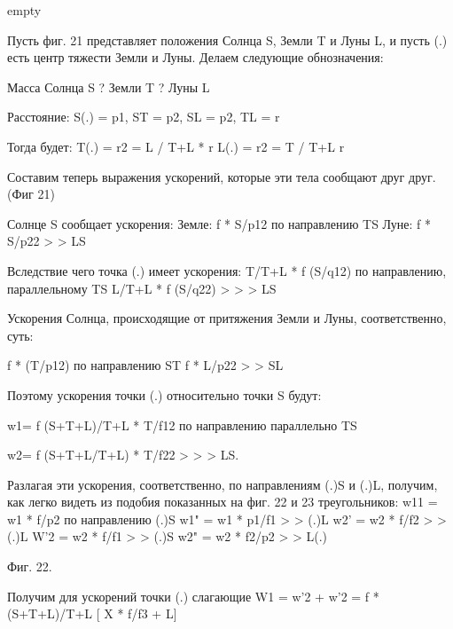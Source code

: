 \documentclass[a4paper,12pt]{article}
\begin{document}
\noindent 
empty 

Пусть фиг. 21 представляет положения Солнца S, Земли T и Луны L, и пусть (.) есть центр тяжести Земли и Луны. Делаем следующие обнозначения:

Масса Солнца S
? Земли T
? Луны L

Расстояние:
S(.) = p1, ST = p2, SL = p2, TL = r

Тогда будет:
T(.) = r2 = L / T+L * r
L(.) = r2 = T / T+L r

Составим теперь выражения ускорений, которые эти тела сообщают друг друг.
(Фиг 21)

Солнце S сообщает ускорения:
Земле: f * S/p12 по направлению TS
Луне: f * S/p22 > > LS

Вследствие чего точка (.) имеет ускорения:
T/T+L * f (S/q12) по направлению, параллельному TS
L/T+L * f (S/q22) > > > LS

Ускорения Солнца, происходящие от притяжения Земли и Луны, соответственно, суть:

f * (T/p12) по направлению ST
f * L/p22 > > SL

Поэтому ускорения точки (.) относительно точки S будут:

w1= f (S+T+L)/T+L * T/f12 по направлению параллельно TS

w2= f (S+T+L/T+L) * T/f22 > > > LS.

Разлагая эти ускорения, соответственно, по направлениям (.)S и (.)L, получим, как легко видеть из подобия показанных на фиг. 22 и 23 треугольников:
w11 = w1 * f/p2 по направлению (.)S
w1" = w1 * p1/f1 > > (.)L
w2' = w2 * f/f2  > > (.)L
W'2 = w2 * f/f1  > > (.)S
w2" = w2 * f2/p2 > > L(.)

Фиг. 22.

Получим для ускорений точки (.) слагающие
W1 = w'2 + w'2 = f * (S+T+L)/T+L [ X * f/f3 + L]
\end{document}
